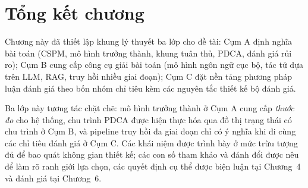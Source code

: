 
\section{Tổng kết chương}
\label{sec:ch2-summary}

Chương này đã thiết lập khung lý thuyết ba lớp cho đề tài: Cụm A định nghĩa bài toán (CSPM, mô hình trưởng thành, khung tuân thủ, PDCA, đánh giá rủi ro); Cụm B cung cấp công cụ giải bài toán (mô hình ngôn ngữ cục bộ, tác tử dựa trên LLM, RAG, truy hồi nhiều giai đoạn); Cụm C đặt nền tảng phương pháp luận đánh giá theo bốn nhóm chỉ tiêu kèm các nguyên tắc thiết kế bộ đánh giá.

Ba lớp này tương tác chặt chẽ: mô hình trưởng thành ở Cụm A cung cấp \textit{thước đo} cho hệ thống, chu trình PDCA được hiện thực hóa qua đồ thị trạng thái có chu trình ở Cụm B, và pipeline truy hồi đa giai đoạn chỉ có ý nghĩa khi đi cùng các chỉ tiêu đánh giá ở Cụm C. Các khái niệm được trình bày ở mức trừu tượng đủ để bao quát không gian thiết kế; các con số tham khảo và đánh đổi được nêu để làm rõ ranh giới lựa chọn, các quyết định cụ thể được biện luận tại Chương~4 và đánh giá tại Chương~6.
